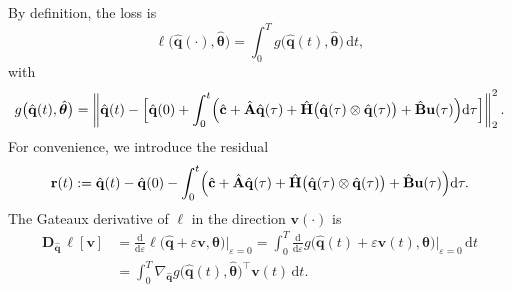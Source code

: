 By definition, the loss is\\
$$\ell\bigl(\hat{\mathbf{q}}(\cdot),\hat{\bm{\theta}}\bigr)=\int_{0}^{T}g\bigl(\hat{\mathbf{q}}(t),\hat{\bm{\theta}}\bigr)\,\mathrm{d}t,$$
with\\
$$g\bigl(\hat{\mathbf{q}}(t),\hat{\bm{\theta}}\bigr)=\left\|\hat{\mathbf{q}}(t)-\Bigl[\hat{\mathbf{q}}(0)+\int_{0}^{t}\Bigl(\hat{\mathbf{c}}+\hat{\mathbf{A}}\hat{\mathbf{q}}(\tau)+\hat{\mathbf{H}}\bigl(\hat{\mathbf{q}}(\tau)\otimes\hat{\mathbf{q}}(\tau)\bigr)+\hat{\mathbf{B}}\mathbf{u}(\tau)\Bigr)\mathrm{d}\tau\Bigr]
\right\|_{2}^{2}.$$
For convenience, we introduce the residual\\
$$\mathbf{r}(t):=\hat{\mathbf{q}}(t)-\hat{\mathbf{q}}(0)-\int_{0}^{t}\Bigl(\hat{\mathbf{c}}
+\hat{\mathbf{A}}\hat{\mathbf{q}}(\tau)
+\hat{\mathbf{H}}\bigl(\hat{\mathbf{q}}(\tau)\otimes\hat{\mathbf{q}}(\tau)\bigr)
+\hat{\mathbf{B}}\mathbf{u}(\tau)
\Bigr)\mathrm{d}\tau.$$
The Gateaux derivative of $\ell$ in the direction $\mathbf{v}(\cdot)$ is\\
\begin{align*}
\bm{D}_{\hat{\mathbf{q}}}\,\ell[\mathbf{v}]
&=\frac{\mathrm{d}}{\mathrm{d}\varepsilon}
\ell\bigl(\hat{\mathbf{q}}+\varepsilon\mathbf{v},\hat{\bm{\theta}}\bigr)\Big|_{\varepsilon=0}=\int_{0}^{T}
\frac{\mathrm{d}}{\mathrm{d}\varepsilon}g\bigl(\hat{\mathbf{q}}(t)+\varepsilon\mathbf{v}(t),\hat{\bm{\theta}}\bigr)\Big|_{\varepsilon=0}\,\mathrm{d}t\\
&=\int_{0}^{T}\nabla_{\hat{\mathbf{q}}}g\bigl(\hat{\mathbf{q}}(t),\hat{\bm{\theta}}\bigr)^{\!\top}
\mathbf{v}(t)\,\mathrm{d}t.
\end{align*}

